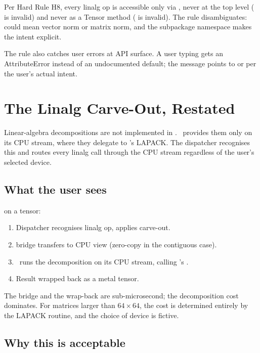 Per Hard Rule H8, every linalg op is accessible only via
, never at the top level
( is invalid) and never as a Tensor method
( is invalid). The rule disambiguates: 
could mean vector norm or matrix norm, and the subpackage
namespace makes the intent explicit.

The rule also catches user errors at API surface. A user typing
 gets an AttributeError instead of an undocumented
default; the message points to  or
 per the user's actual intent.

\section{The Linalg Carve-Out, Restated}
\label{sec:linalg:carveout}

Linear-algebra decompositions are not implemented in \Metal.
\MLX\ provides them only on its CPU stream, where they delegate
to \Accelerate's LAPACK. The dispatcher recognises this and
routes every linalg call through the CPU stream regardless of the
user's selected device.

\subsection{What the user sees}
\label{ssec:linalg:user_view}

 on a  tensor:

\begin{enumerate}
  \item Dispatcher recognises linalg op, applies carve-out.
  \item {} bridge transfers  to CPU
    view (zero-copy in the contiguous case).
  \item \MLX\ runs the decomposition on its CPU stream, calling
    \Accelerate's .
  \item Result wrapped back as a metal tensor.
\end{enumerate}

The bridge and the wrap-back are sub-microsecond; the
decomposition cost dominates. For matrices larger than $64 \times
64$, the cost is determined entirely by the LAPACK routine, and
the choice of device is fictive.

\subsection{Why this is acceptable}
\label{ssec:linalg:why_acceptable}


